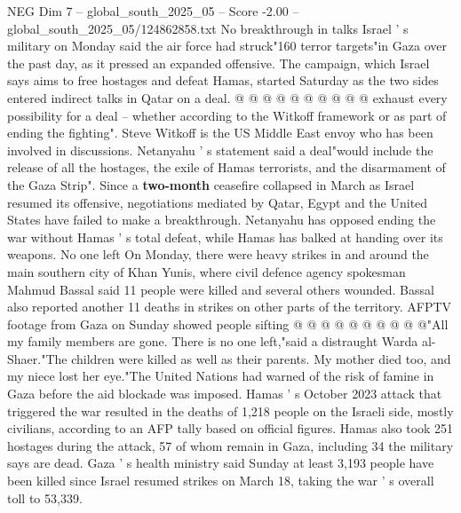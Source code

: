 \begin{textsample}{NEG Dim 7 – global\_south\_2025\_05 – Score -2.00 – global\_south\_2025\_05/124862858.txt}
No breakthrough in talks Israel ' s military on Monday said the air force had struck"160 terror targets"in Gaza over the past day, as it pressed an expanded offensive.
The campaign, which Israel says aims to free hostages and defeat Hamas, started Saturday as the two sides entered indirect talks in Qatar on a deal. @ @ @ @ @ @ @ @ @ @ exhaust every possibility for a deal -- whether according to the Witkoff framework or as part of ending the fighting".
Steve Witkoff is the US Middle East envoy who has been involved in discussions.
Netanyahu ' s statement said a deal"would include the release of all the hostages, the exile of Hamas terrorists, and the disarmament of the Gaza Strip".
Since a \textbf{two-month} ceasefire collapsed in March as Israel resumed its offensive, negotiations mediated by Qatar, Egypt and the United States have failed to make a breakthrough.
Netanyahu has opposed ending the war without Hamas ' s total defeat, while Hamas has balked at handing over its weapons.
No one left On Monday, there were heavy strikes in and around the main southern city of Khan Yunis, where civil defence agency spokesman Mahmud Bassal said 11 people were killed and several others wounded.
Bassal also reported another 11 deaths in strikes on other parts of the territory.
AFPTV footage from Gaza on Sunday showed people sifting @ @ @ @ @ @ @ @ @ @"All my family members are gone.
There is no one left,"said a distraught Warda al-Shaer."The children were killed as well as their parents.
My mother died too, and my niece lost her eye."The United Nations had warned of the risk of famine in Gaza before the aid blockade was imposed.
Hamas ' s October 2023 attack that triggered the war resulted in the deaths of 1,218 people on the Israeli side, mostly civilians, according to an AFP tally based on official figures.
Hamas also took 251 hostages during the attack, 57 of whom remain in Gaza, including 34 the military says are dead.
Gaza ' s health ministry said Sunday at least 3,193 people have been killed since Israel resumed strikes on March 18, taking the war ' s overall toll to 53,339.

\end{textsample}
